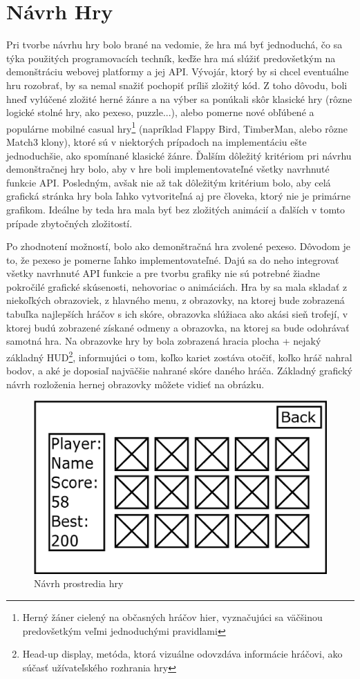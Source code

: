 \section{Návrh Hry}
Pri tvorbe návrhu hry bolo brané na vedomie, že hra má byť jednoduchá, čo sa týka použitých programovacích techník, keďže hra má slúžiť predovšetkým na demonštráciu webovej platformy a jej API. Vývojár, ktorý by si chcel eventuálne hru rozobrať, by sa nemal snažiť pochopiť príliš zložitý kód. Z toho dôvodu, boli hneď vylúčené zložité herné žánre a na výber sa ponúkali skôr klasické hry (rôzne logické stolné hry, ako pexeso, puzzle...), alebo pomerne nové obľúbené a populárne mobilné casual hry\footnote{Herný žáner cielený na občasných hráčov hier, vyznačujúci sa väčšinou predovšetkým veľmi jednoduchými pravidlami} (napríklad Flappy Bird, TimberMan, alebo rôzne Match3 klony), ktoré sú v niektorých prípadoch na implementáciu ešte jednoduchšie, ako spomínané klasické žánre. Ďalším dôležitý kritériom pri návrhu demonštračnej hry bolo, aby v hre boli implementovateľné všetky navrhnuté funkcie API. Posledným, avšak nie až tak dôležitým kritérium bolo, aby celá grafická stránka hry bola ľahko vytvoriteľná aj pre človeka, ktorý nie je primárne grafikom. Ideálne by teda hra mala byť bez zložitých animácií a ďalších v tomto prípade zbytočných zložitostí.  

Po zhodnotení možností, bolo ako demonštračná hra zvolené pexeso. Dôvodom je to, že pexeso je pomerne ľahko implementovateľné. Dajú sa do neho integrovať všetky navrhnuté API funkcie a pre tvorbu grafiky nie sú potrebné žiadne pokročilé grafické skúsenosti, nehovoriac o animáciách. Hra by sa mala skladať z niekoľkých obrazoviek, z hlavného menu, z obrazovky, na ktorej bude zobrazená tabuľka najlepších hráčov s ich skóre, obrazovka slúžiaca ako akási sieň trofejí, v ktorej budú zobrazené získané odmeny a obrazovka, na ktorej sa bude odohrávať samotná hra. Na obrazovke hry by bola zobrazená hracia plocha + nejaký základný HUD\footnote{Head-up display, metóda, ktorá vizuálne odovzdáva informácie hráčovi, ako súčasť užívateľského rozhrania hry}, informujúci o tom, koľko kariet zostáva otočiť, koľko hráč nahral bodov, a aké je doposiaľ najväčšie nahrané skóre daného hráča. Základný grafický návrh rozloženia hernej obrazovky môžete vidieť na obrázku.
\begin{figure}[h]
  \centering
  \includegraphics[scale=0.5]{fig/gui-hra.eps}
  \caption{Návrh prostredia hry}
  \label{fig:guihra}
\end{figure}

